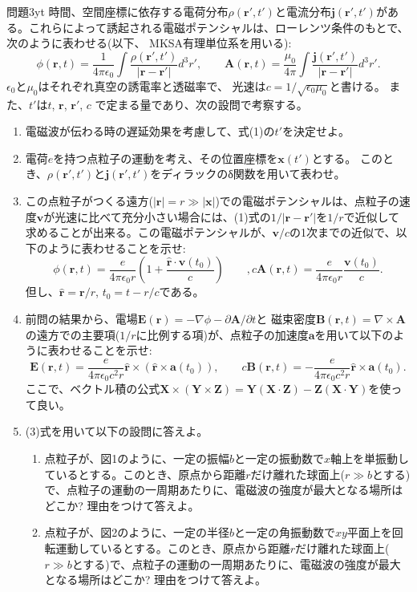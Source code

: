 \documentclass[fleqn]{jbook}
\begin{document}
\let\b\mathbf
\begin{question}{問題3}{yt}
時間、空間座標に依存する電荷分布$\rho(\b{r}',t')$と電流分布$\b j(\b r',t')$がある。これらによって誘起される電磁ポテンシャルは、ローレンツ条件のもとで、次のように表わせる(以下、 MKSA有理単位系を用いる):\begin{equation}
\phi(\b r,t)=\frac1{4\pi\epsilon_0}\int\frac{\rho(\b r',t')}{|\b r-\b r'|}d^3 r',\qquad
\b A(\b r,t)=\frac{\mu_0}{4\pi}\int\frac{\b j(\b r',t')}{|\b r-\b r'|}d^3 r'.
\end{equation}$\epsilon_0$と$\mu_0$はそれぞれ真空の誘電率と透磁率で、
光速は$c=1/\sqrt{\epsilon_0\mu_0}$と書ける。
また、$t'$は$t$, $\b r$, $\b r'$, $c$ で定まる量であり、次の設問で考察する。
\begin{enumerate}
\item 電磁波が伝わる時の遅延効果を考慮して、式(1)の$t'$を決定せよ。
\item 電荷$e$を持つ点粒子の運動を考え、その位置座標を$\b x(t')$とする。
このとき、$\rho(\b r',t')$と$\b j(\b r',t')$をディラックのδ関数を用いて表わせ。\item この点粒子がつくる遠方($|\b r|=r\gg |\b  x|$)での電磁ポテンシャルは、点粒子の速度$\b v$が光速に比べて充分小さい場合には、(1)式の$1/|\b r-\b r'|$を$1/r$で近似して求めることが出来る。この電磁ポテンシャルが、$\b v/c$の1次までの近似で、以下のように表わせることを示せ:\begin{equation}
\phi(\b r,t)=\frac{e}{4\pi\epsilon_0 r}\left(
1+\frac{\hat{\b r}\cdot\b v(t_0)}c
\right)\qquad,
c\b A(\b r,t)=\frac{e}{4\pi\epsilon_0r}\frac{\b v(t_0)}{c}.
\end{equation}但し、$\hat{\b r}=\b r/r$, $t_0=t-r/c$である。
\item 前問の結果から、電場$\b E(\b r)=-\nabla\phi-\partial\b A/\partial t$と
磁束密度$\b B(\b r,t)=\nabla\times\b A$の遠方での主要項($1/r$に比例する項)が、点粒子の加速度$\b a$を用いて以下のように表わせることを示せ:\begin{equation}
\b E(\b r,t)=\frac{e}{4\pi\epsilon_0c^2r}\hat{\b r}\times(\hat{\b r}\times\b a(t_0)),\qquad
c\b B(\b r,t)=-\frac{e}{4\pi\epsilon_0c^2r}\hat{\b r}\times\b a(t_0).
\end{equation}ここで、ベクトル積の公式$\b X\times(\b Y\times\b Z)=\b Y(\b X\cdot\b Z)-\b Z(\b X\cdot\b Y)$を使って良い。
\item (3)式を用いて以下の設問に答えよ。
\begin{enumerate}
\item 点粒子が、図1のように、一定の振幅$b$と一定の振動数で$x$軸上を単振動しているとする。このとき、原点から距離$r$だけ離れた球面上($r\gg b$とする)で、点粒子の運動の一周期あたりに、電磁波の強度が最大となる場所はどこか? 理由をつけて答えよ。
\item  点粒子が、図2のように、一定の半径$b$と一定の角振動数で$xy$平面上を回転運動しているとする。このとき、原点から距離$r$だけ離れた球面上($r\gg b$とする)で、点粒子の運動の一周期あたりに、電磁波の強度が最大となる場所はどこか? 理由をつけて答えよ。
\end{enumerate}
\end{enumerate}
\begin{center}

\end{center}
\end{question}
\end{document}
